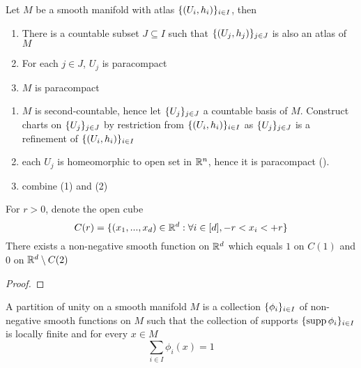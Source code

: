 \begin{proposition}
	Let $M$ be a smooth manifold with atlas $\{(U_i, h_i)\}_{i \in I}$, then
	\begin{enumerate}
		\item There is a countable subset $J \subseteq I$ such that $\{(U_j, h_j)\}_{j \in J}$ is also an atlas of $M$
		
		\item For each $j \in J$, $U_j$ is paracompact
		
		\item $M$ is paracompact
	\end{enumerate}
	\begin{longproof}
		\begin{enumerate}
			\item $M$ is second-countable, hence let $\{U_j\}_{j \in J}$ a countable basis of $M$. Construct charts on $\{U_j\}_{j \in J}$ by restriction from $\{(U_i, h_i)\}_{i \in I}$ as $\{U_j\}_{j \in J}$ is a refinement of $\{(U_i, h_i)\}_{i \in I}$
			
			\item each $U_j$ is homeomorphic to open set in $\mathbb{R}^n$, hence it is paracompact ().
			
			\item combine (1) and (2)
		\end{enumerate}
		
	\end{longproof}
\end{proposition}



\begin{lemma}
	For $r>0$, denote the open cube
	$$
	C(r) = \{(x_1, ..., x_d) \in \mathbb{R}^d: \forall i \in [d], -r < x_i < +r\}
	$$
	There exists a non-negative smooth function on $\mathbb{R}^d$ which equals $1$ on $C(1)$ and $0$ on $\mathbb{R}^d \setminus C(2)$
	\begin{proof}
	\end{proof}
\end{lemma}



\begin{definition}
	A partition of unity on a smooth manifold $M$ is a collection $\{\phi_i\}_{i \in I}$ of non-negative smooth functions on $M$ such that the collection of supports $\{\operatorname{supp} \phi_i\}_{i \in I}$ is locally finite and for every $x \in M$
	$$
	\sum_{i \in I} \phi_i(x) = 1
	$$
\end{definition}

